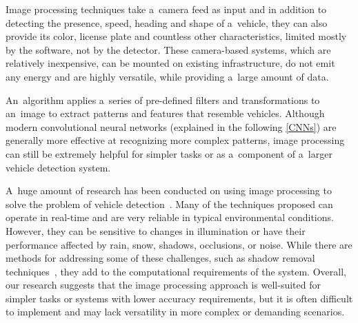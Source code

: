 





Image processing techniques take a~camera feed as input and in addition to
detecting the presence, speed, heading and shape of a~vehicle, they can also
provide its color, license plate and countless other characteristics, limited
mostly by the software, not by the detector. These camera-based systems, which
are relatively inexpensive, can be mounted on existing infrastructure, do not
emit any energy and are highly versatile, while providing a~large amount of
data.

An~algorithm applies a~series of pre-defined filters and transformations to
an~image to extract patterns and features that resemble vehicles. Although
modern convolutional neural networks (explained in the following \autoref{CNNs})
are generally more effective at recognizing more complex patterns, image
processing can still be extremely helpful for simpler tasks or as a~component of
a~larger vehicle detection system.

A~huge amount of research has been conducted on using image processing to solve
the problem of vehicle detection~\cite{ImageProcessingOverview}. Many of the
techniques proposed can operate in real-time and are very reliable in typical
environmental conditions. However, they can be sensitive to changes in
illumination or have their performance affected by rain, snow, shadows,
occlusions, or noise. While there are methods for addressing some of these
challenges, such as shadow removal techniques~\cite{ShadowRemoval}, they add to
the computational requirements of the system. Overall, our research suggests
that the image processing approach is well-suited for simpler tasks or systems
with lower accuracy requirements, but it is often difficult to implement and may
lack versatility in more complex or demanding scenarios.




